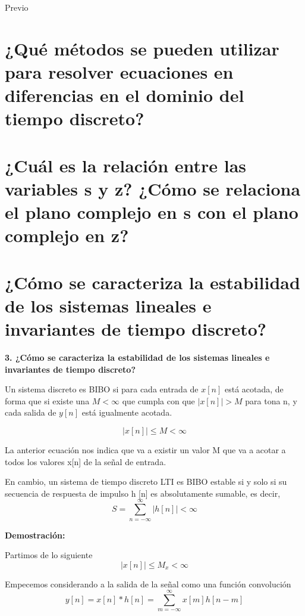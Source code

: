 {\Huge Previo }
\usepackage{mathtools}
\noindent \justifying


\section{¿Qué métodos se pueden utilizar para resolver ecuaciones en diferencias en el dominio del tiempo discreto?} 

\section{¿Cuál es la relación entre las variables s y z? ¿Cómo se relaciona el plano complejo en s con el plano complejo en z?}

\section{¿Cómo se caracteriza la estabilidad de los sistemas lineales e invariantes de tiempo discreto?}

	\noindent\textbf{3. ¿Cómo se caracteriza la estabilidad de los sistemas lineales e invariantes de tiempo discreto?}
	
	Un sistema discreto es BIBO si para cada entrada de $x[n]$ está acotada, de forma que si existe una $M<\infty$ que cumpla con que $|x[n]|>M$ para tona n, y cada salida de $y[n]$ está igualmente acotada.
	
	\begin{equation}
	|x[n]| \leq M < \infty
	\end{equation}
	
	La anterior ecuación nos indica que va a existir un valor M que va a acotar a todos los valores x[n] de la señal de entrada.
	
	En cambio, un sistema de tiempo discreto LTI es BIBO estable si y solo si su secuencia de respuesta de impulso {h [n]} es absolutamente sumable, es decir,
	\begin{equation}
		S=\sum_{n=-\infty}^{\infty}|h[n]|<\infty
	\end{equation}
	
	\noindent\textbf{Demostración:}

	Partimos de lo siguiente
	\begin{equation}
		|x[n]| \leq M_x < \infty
	\end{equation}		
	
	Empecemos considerando a la salida de la señal como una función convolución
	\begin{equation}
		y[n]=x[n]*h[n]=\sum_{m=-\infty}^{\infty}x[m]h[n-m]
	\end{equation}
	

